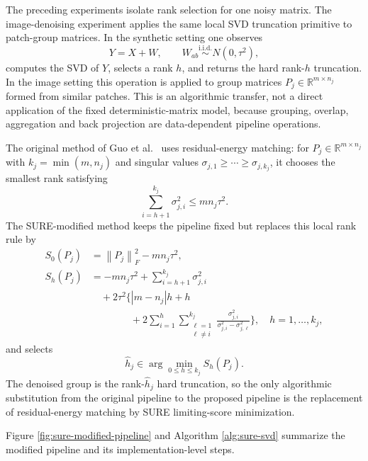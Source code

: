 \documentclass[12pt,reqno]{amsart}
\numberwithin{equation}{section}
\theoremstyle{plain}
\theoremstyle{definition}
\newcommand{\R}{\mathbb{R}}
\newcommand{\norm}[1]{\left\lVert #1\right\rVert}
\begin{document}
The preceding experiments isolate rank selection for one noisy matrix. The image-denoising experiment applies the same local SVD truncation primitive to patch-group matrices. In the synthetic setting one observes
\begin{equation}
    Y=X+W,
    \qquad W_{ab}\stackrel{\mathrm{i.i.d.}}{\sim}N(0,\tau^2),
\end{equation}
computes the SVD of $Y$, selects a rank $h$, and returns the hard rank-$h$ truncation. In the image setting this operation is applied to group matrices $P_j\in\R^{m\times n_j}$ formed from similar patches. This is an algorithmic transfer, not a direct application of the fixed deterministic-matrix model, because grouping, overlap, aggregation and back projection are data-dependent pipeline operations.

The original method of Guo et al.\ \cite{guo2016efficient} uses residual-energy matching: for $P_j\in\R^{m\times n_j}$ with $k_j=\min(m,n_j)$ and singular values $\sigma_{j,1}\geq\cdots\geq\sigma_{j,k_j}$, it chooses the smallest rank satisfying
\begin{equation}
    \sum_{i=h+1}^{k_j}\sigma_{j,i}^{2}
    \leq m n_j\tau^2.
\end{equation}
The SURE-modified method keeps the pipeline fixed but replaces this local rank rule by
\begin{equation}
\begin{aligned}
    S_0(P_j)&=\norm{P_j}_F^2-m n_j\tau^2,\\[-0.2em]
    S_h(P_j)&=-m n_j\tau^2+
    \sum_{i=h+1}^{k_j}\sigma_{j,i}^{2}\\[-0.2em]
    &\quad+2\tau^2\Biggl\{|m-n_j|h+h\\[-0.2em]
    &\qquad\qquad
    +2\sum_{i=1}^{h}\sum_{\substack{\ell=1\\ \ell\neq i}}^{k_j}
        \frac{\sigma_{j,i}^{2}}{\sigma_{j,i}^{2}-\sigma_{j,\ell}^{2}}
    \Biggr\},\quad h=1,\ldots,k_j,
\end{aligned}
\end{equation}
and selects
\begin{equation}
    \widehat h_j\in\arg\min_{0\leq h\leq k_j}S_h(P_j).
\end{equation}
The denoised group is the rank-$\widehat h_j$ hard truncation, so the only algorithmic substitution from the original pipeline to the proposed pipeline is the replacement of residual-energy matching by SURE limiting-score minimization.

Figure \ref{fig:sure-modified-pipeline} and Algorithm \ref{alg:sure-svd} summarize the modified pipeline and its implementation-level steps.
\end{document}

